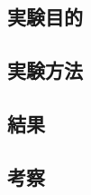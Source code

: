 \documentclass[../main]{subfiles}
\begin{document}
\setcounter{secnumdepth}{2}
    \chapter{}
    \section{実験目的}
    \section{実験方法}
    \section{結果}
    \section{考察}
\end{document}
